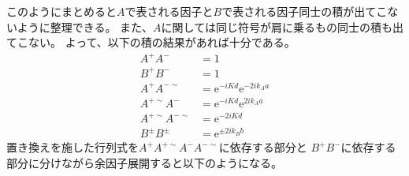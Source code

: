\documentclass[autodetect-engine,dvipdfmx-if-dvi,ja=standard,a4paper,layout=v2]{bxjsreport}
\begin{document}
    このようにまとめると$A$で表される因子と$B$で表される因子同士の積が出てこないように整理できる。
    また、$A$に関しては同じ符号が肩に乗るもの同士の積も出てこない。
    よって、以下の積の結果があれば十分である。
    \begin{align}
    A^+A^-&=1\nonumber\\
    B^+B^-&=1\nonumber\\
    A^+A^{-\sim}&=\mathrm{e}^{-iKd}\mathrm{e}^{-2ik_Aa}\nonumber\\
    A^{+\sim}A^-&=\mathrm{e}^{-iKd}\mathrm{e}^{2ik_Aa}\nonumber\\
    A^{+\sim}A^{-\sim}&=\mathrm{e}^{-2iKd}\nonumber\\
    B^\pm B^\pm &= \mathrm{e}^{\pm 2ik_Bb}
    \end{align}
    置き換えを施した行列式を$A^+A^{+\sim}A^-A^{-\sim}$に依存する部分と
    $B^+B^-$に依存する部分に分けながら余因子展開すると以下のようになる。
\end{document}
